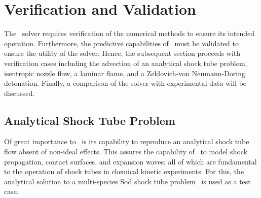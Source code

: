 \section{Verification and Validation}\label{SEC_VV}
The \stnshk\  solver requires verification of the numerical methods to ensure its intended operation. Furthermore, the predictive capabilities of \stnshk\ must be validated to ensure the utility of the solver. Hence, the subsequent section proceeds with verification cases including the advection of an analytical shock tube problem, isentropic nozzle flow, a laminar flame, and a Zeldovich-von Neumann-Doring detonation. Finally, a comparison of the solver with experimental data will be discussed.
\subsection{Analytical Shock Tube Problem}
Of great importance to \stnshk\ is its capability to reproduce an analytical shock tube flow absent of non-ideal effects. This assures the capability of \stnshk\ to model shock propagation, contact surfaces, and expansion waves; all of which are fundamental to the operation of shock tubes in chemical kinetic experiments. For this, the analytical solution to a multi-species Sod shock tube problem~\cite{SOD_JCP78,LV_JCP2014} is used as a test case.

